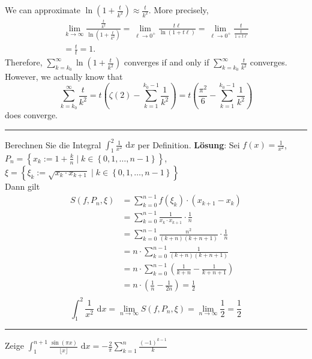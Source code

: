 \documentclass[a4paper,fontsize = 7pt]{scrartcl}
\def\limn{\lim_{n\to \infty}}
\def\dx{\text{ d}x}
\begin{document}
We can approximate $\ln\left(1+\frac t{k^2}\right)\approx\frac t{k^2}$. More precisely,
\begin{align*}
\lim_{k\to\infty}\frac{\frac t{k^2}}{\ln\left(1+\frac t{k^2}\right)}=\lim_{\ell\to0^+}\frac{t\ell}{\ln\left(1+t\ell\right)}=\lim_{\ell\to0^+}\frac{t}{\frac t{1+t\ell}}\\=\frac tt=1.
\end{align*}
Therefore, $\sum_{k=k_0}^\infty\ln\left(1+\frac t{k^2}\right)$ converges if and only if $\sum_{k=k_0}^\infty\frac t{k^2}$ converges. However, we actually know that
$$
\sum_{k=k_0}^\infty\frac t{k^2}=t\left(\zeta(2)-\sum_{k=1}^{k_0-1}\frac1{k^2}\right)=t\left(\frac{\pi^2}6-\sum_{k=1}^{k_0-1}\frac1{k^2}\right)
$$
does converge.

\vspace{0.1 cm}
\hrule
\vspace{0.2 cm}

Berechnen Sie die Integral $\int_1^2 \frac{1}{x^2}\dx$ per Definition.
\textbf{Lösung}: Sei $f(x) = \frac{1}{x^2}$, 
\\$P_n = \left\{x_k := 1 + \frac{k}{n} \mid k \in \left\{0, 1, \dots, n-1\right\} \right\}$,
\\$\xi = \left\{\xi_k := \sqrt{x_k \cdot x_{k+1}} \mid k \in \left\{0, 1, \dots, n-1\right\}\right\}$
\\Dann gilt
\begin{align*}
  S(f, P_n, \xi) &= \sum_{k = 0}^{n - 1} f(\xi_k)\cdot(x_{k+1}-x_k)\\
                 &= \sum_{k = 0}^{n - 1} \frac{1}{x_k \cdot x_{k+1}} \cdot \frac{1}{n}\\
                 &= \sum_{k = 0}^{n - 1} \frac{n^2}{(k + n)(k + n + 1)}\cdot \frac{1}{n}\\
                 &= n \cdot \sum_{k = 0}^{n - 1} \frac{1}{(k + n)(k + n + 1)}\\
                 &= n \cdot \sum_{k = 0}^{n - 1} \left(\frac{1}{k + n} - \frac{1}{k + n + 1}\right)\\
                 &= n \cdot \left(\frac{1}{n}-\frac{1}{2n}\right) = \frac{1}{2}\\
\end{align*}
$$\int_1^2 \frac{1}{x^2}\dx = \limn S(f, P_n, \xi) = \limn \frac{1}{2} = \frac{1}{2}$$

\vspace{0.1 cm}
\hrule
\vspace{0.2 cm}

Zeige $\int_1^{n+1} \frac{\sin(\pi x)}{\lfloor x\rfloor}\dx = -\frac{2}{\pi}\sum_{k=1}^{n}\frac{(-1)^{k-1}}{k}$
\end{document}
